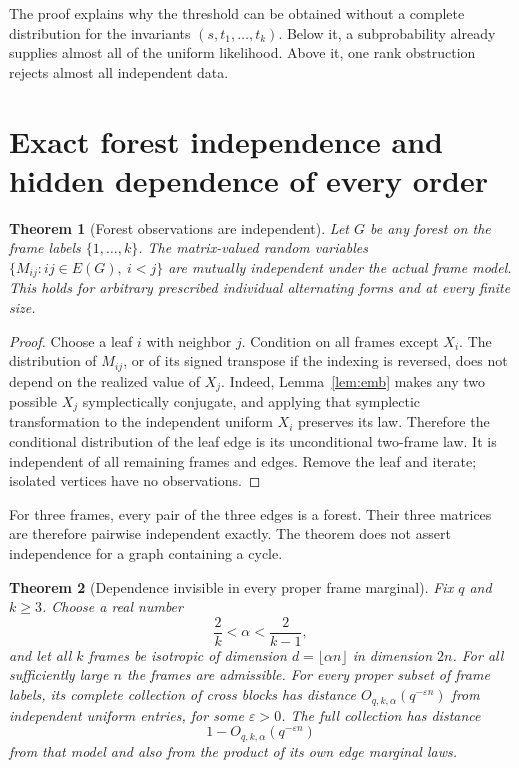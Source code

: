 \documentclass[11pt,letterpaper]{article}
\newtheorem{theorem}{Theorem}[section]
\theoremstyle{definition}
\theoremstyle{remark}
\begin{document}
The proof explains why the threshold can be obtained without a complete distribution for the invariants $(s,t_1,\ldots,t_k)$. Below it, a subprobability already supplies almost all of the uniform likelihood. Above it, one rank obstruction rejects almost all independent data.

\section{Exact forest independence and hidden dependence of every order}

\begin{theorem}[Forest observations are independent]\label{thm:forest}
Let $G$ be any forest on the frame labels $\{1,\ldots,k\}$. The matrix-valued random variables $\{M_{ij}:ij\in E(G),\ i<j\}$ are mutually independent under the actual frame model. This holds for arbitrary prescribed individual alternating forms and at every finite size.
\end{theorem}

\begin{proof}
Choose a leaf $i$ with neighbor $j$. Condition on all frames except $X_i$. The distribution of $M_{ij}$, or of its signed transpose if the indexing is reversed, does not depend on the realized value of $X_j$. Indeed, Lemma~\ref{lem:emb} makes any two possible $X_j$ symplectically conjugate, and applying that symplectic transformation to the independent uniform $X_i$ preserves its law. Therefore the conditional distribution of the leaf edge is its unconditional two-frame law. It is independent of all remaining frames and edges. Remove the leaf and iterate; isolated vertices have no observations.
\end{proof}

For three frames, every pair of the three edges is a forest. Their three matrices are therefore pairwise independent exactly. The theorem does not assert independence for a graph containing a cycle.

\begin{theorem}[Dependence invisible in every proper frame marginal]\label{thm:hierarchy}
Fix $q$ and $k\ge3$. Choose a real number
\begin{equation}\label{eq:alpha}
 \frac2k<\alpha<\frac2{k-1},
\end{equation}
and let all $k$ frames be isotropic of dimension $d=\lfloor\alpha n\rfloor$ in dimension $2n$. For all sufficiently large $n$ the frames are admissible. For every proper subset of frame labels, its complete collection of cross blocks has distance $O_{q,k,\alpha}(q^{-\varepsilon n})$ from independent uniform entries, for some $\varepsilon>0$. The full collection has distance
\[
 1-O_{q,k,\alpha}(q^{-\varepsilon n})
\]
from that model and also from the product of its own edge marginal laws.
\end{theorem}
\end{document}
